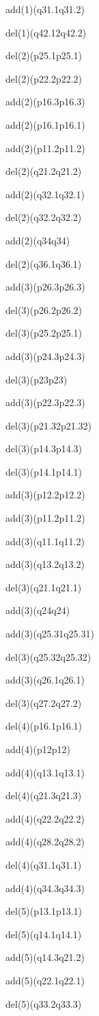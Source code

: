 \documentclass[]{article}
\begin{document}
add(1)(q31.1q31.2)

del(1)(q42.12q42.2)

del(2)(p25.1p25.1)

del(2)(p22.2p22.2)

add(2)(p16.3p16.3)

add(2)(p16.1p16.1)

add(2)(p11.2p11.2)

del(2)(q21.2q21.2)

add(2)(q32.1q32.1)

del(2)(q32.2q32.2)

add(2)(q34q34)

del(2)(q36.1q36.1)

add(3)(p26.3p26.3)

del(3)(p26.2p26.2)

del(3)(p25.2p25.1)

add(3)(p24.3p24.3)

del(3)(p23p23)

add(3)(p22.3p22.3)

del(3)(p21.32p21.32)

del(3)(p14.3p14.3)

del(3)(p14.1p14.1)

add(3)(p12.2p12.2)

add(3)(p11.2p11.2)

add(3)(q11.1q11.2)

add(3)(q13.2q13.2)

del(3)(q21.1q21.1)

add(3)(q24q24)

add(3)(q25.31q25.31)

del(3)(q25.32q25.32)

add(3)(q26.1q26.1)

del(3)(q27.2q27.2)

del(4)(p16.1p16.1)

add(4)(p12p12)

add(4)(q13.1q13.1)

del(4)(q21.3q21.3)

add(4)(q22.2q22.2)

add(4)(q28.2q28.2)

del(4)(q31.1q31.1)

add(4)(q34.3q34.3)

del(5)(p13.1p13.1)

del(5)(q14.1q14.1)

add(5)(q14.3q21.2)

add(5)(q22.1q22.1)

del(5)(q33.2q33.3)
\end{document}
